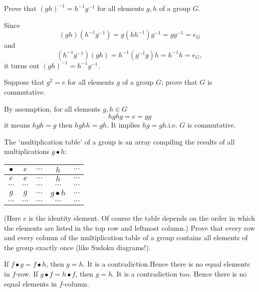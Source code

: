\begin{problem}[1.3]
Prove that $(gh)^{-1}=h^{-1}g^{-1}$ for all elements $g,h$ of a group $G$.
\end{problem}

\begin{solution}
Since $$(gh)(h^{-1}g^{-1}) = g(hh^{-1})g^{-1} = gg^{-1} = e_G$$ and $$(h^{-1}g^{-1})(gh) = h^{-1}(g^{-1}g)h=h^{-1}h=e_G,$$
it turns out $(gh)^{-1}=h^{-1}g^{-1}$.
\end{solution}

\begin{problem}[1.4]
Suppose that $g^2 = e$ for all elements $g$ of a group $G$; prove that $G$ is commutative.
\end{problem}

\begin{solution}
By assumption, for all elements $g,h\in G$
$$hghg=e=gg$$
it means $hgh=g$ then $hghh=gh$. It implies $hg=gh$.i.e. $G$ is commutative.
\end{solution}

\begin{problem}[1.5]
  The `multiplication table' of a group is an array compiling the results of all
  multiplications $g \bullet h$:
\begin{center}
\begin{tabular}{c||c|c|c|c}

  $\bullet$ & $e$ & $\cdots$ & $h$ & $\cdots$ \\ \hline \hline
  $e$ & $e$ & $\cdots$ & $h$ & $\cdots$ \\ \hline
  $\cdots$ & $\cdots$ & $\cdots$ & $\cdots$ & $\cdots$ \\ \hline
  $g$ & $g$ & $\cdots$ & $g\bullet h$ & $\cdots$ \\ \hline
  $\cdots$ & $\cdots$ & $\cdots$ & $\cdots$ & $\cdots$ \\
\end{tabular}
\end{center}
  (Here $e$ is the identity element. Of course the table depends on the order in
  which the elements are listed in the top row and leftmost column.) Prove that
  every row and every column of the multiplication table of a group contains all
  elements of the group exactly once (like Sudoku diagrams!).
\end{problem}

\begin{solution}
If $f\bullet g = f \bullet h$, then $g=h$. It is a contradiction.Hence there is no equal elements in $f$-row. 
If $g\bullet f= h \bullet f$, then $g=h$. It is a contradiction too. Hence there is no equal elements in $f$-column. 
\end{solution}

